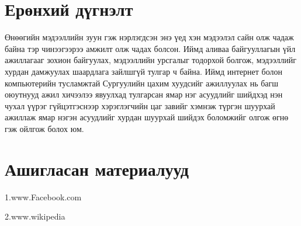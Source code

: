 \documentclass[12pt]{article}
\begin{document}
	\section     {Ерөнхий дүгнэлт}  
	
	
	Өнөөгийн мэдээллийн зуун гэж нэрлэгдсэн энэ үед хэн мэдээлэл сайн олж чадаж байна тэр чинээгээрээ амжилт олж чадах болсон. Иймд аливаа байгууллагын үйл ажиллагааг зохион байгуулах, мэдээллийн урсгалыг тодорхой болгож, мэдээллийг хурдан дамжуулах шаардлага зайлшгүй тулгар ч байна. Иймд интернет болон компьютерийн тусламжтай Сургуулийн цахим хуудсийг ажиллуулах нь багш оюутнууд ажил хичээлээ явуулхад тулгарсан ямар нэг асуудлийг шийдхэд нэн чухал үүрэг гүйцэтгэснээр хэрэглэгчийн цаг завийг хэмнэж түргэн шуурхай ажиллаж ямар нэгэн асуудлийг хурдан шуурхай шийдэх боломжийг олгож өгнө гэж ойлгож болох юм.
	
	
	
	\section     {Ашигласан материалууд}   
	
	
	1.www.Facebook.com   
	
	2.www.wikipedia  
	
\end{document}
